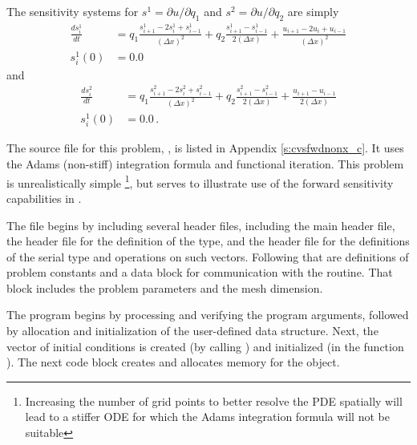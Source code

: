 The sensitivity systems for $s^1 = \partial u / \partial q_1$ and
$s^2 = \partial u / \partial q_2$ are simply
\begin{equation}\label{e:cvsfwdnonx_S1}
  \begin{split}
    \frac{d s^1_i}{dt} 
    &= q_1 \frac{s^1_{i+1}-2s^1_{i}+s^1_{i-1}}{(\Delta x)^{2}}
    + q_2 \frac{s^1_{i+1}-s^1_{i-1}}{2(\Delta x)} 
    + \frac{u_{i+1}-2u_{i}+u_{i-1}}{(\Delta x)^{2}} \\
    s^1_i (0) &= 0.0 
  \end{split}
\end{equation}
and
\begin{equation}\label{e:cvsfwdnonx_S2}
  \begin{split}
    \frac{d s^2_i}{dt} 
    &= q_1 \frac{s^2_{i+1}-2s^2_{i}+s^2_{i-1}}{(\Delta x)^{2}}
    + q_2 \frac{s^2_{i+1}-s^2_{i-1}}{2(\Delta x)} 
    + \frac{u_{i+1}-u_{i-1}}{2(\Delta x)} \\
    s^1_i (0) &= 0.0  \, .
  \end{split}
\end{equation}

The source file for this problem, , is listed in Appendix
\ref{s:cvsfwdnonx_c}.  It uses the Adams (non-stiff) integration formula and
functional iteration.  This problem is unrealistically simple
\footnote{Increasing the number of grid points to better resolve the PDE spatially
will lead to a stiffer ODE for which the Adams integration formula will not
be suitable}, but serves to illustrate use of the forward sensitivity 
capabilities in {\cvodes}.

The  file begins by including several header files, including 
the main {\cvodes} header file, the  header file for the
definition of the  type, and the {\nvecs} header file 
for the definitions of the serial  type and operations on such vectors.
Following that are definitions of problem constants and a data block for communication
with the  routine.  That block includes the problem parameters and the mesh 
dimension.

The  program begins by processing and verifying the program arguments,
followed by allocation and initialization of the user-defined data structure. Next, the
vector of initial conditions is created (by calling ) and
initialized (in the function ). The next code block creates and allocates
memory for the {\cvodes} object. 

